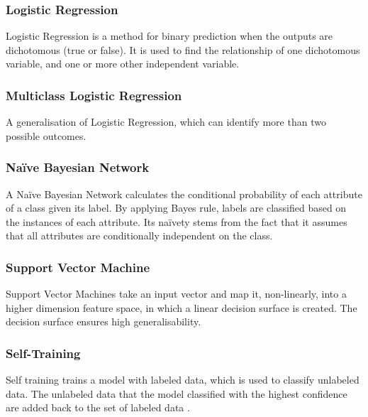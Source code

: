 \documentclass[a4paper,titlepage]{article}
\begin{document}
\subsubsection*{Logistic Regression}
Logistic Regression is a method for binary prediction when the outputs are dichotomous (true or false).
It is used to find the relationship of one dichotomous variable, and one or more other independent variable. \cite{logisticregression}
\subsubsection*{Multiclass Logistic Regression}
A generalisation of Logistic Regression, which can identify more than two possible outcomes. \cite{greene2012}
\subsubsection*{Naïve Bayesian Network}
A Naïve Bayesian Network calculates the conditional probability of each attribute of a class given its label.
By applying Bayes rule, labels are classified based on the instances of each attribute.
Its naïvety stems from the fact that it assumes that all attributes are conditionally independent on the class. \cite{friedman1997bayesian}
\subsubsection*{Support Vector Machine}
Support Vector Machines take an input vector and map it, non-linearly, into a higher dimension feature space, in which a linear decision surface is created.
The decision surface ensures high generalisability. \cite{cortes1995support}
\subsubsection*{Self-Training}
Self training trains a model with labeled data, which is used to classify unlabeled data.
The unlabeled data that the model classified with the highest confidence are added back to the set of labeled data \cite{fazakis2016}.
\end{document}
